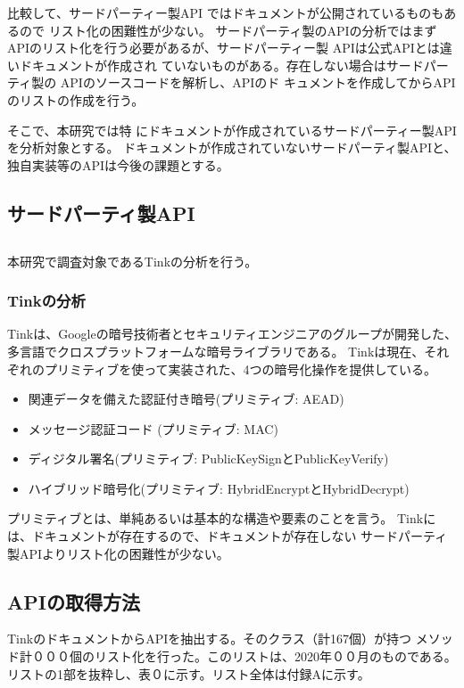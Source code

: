 比較して、サードパーティー製API
ではドキュメントが公開されているものもあるので
リスト化の困難性が少ない。
サードパーティ製のAPIの分析ではまずAPIのリスト化を行う必要があるが、サードパーティー製
APIは公式APIとは違いドキュメントが作成され
ていないものがある。存在しない場合はサードパー
ティ製の APIのソースコードを解析し、APIのド
キュメントを作成してからAPIのリストの作成を行う。


そこで、本研究では特
にドキュメントが作成されているサードパーティー製APIを分析対象とする。
ドキュメントが作成されていないサードパーティ製APIと、独自実装等のAPIは今後の課題とする。

\subsection{サードパーティ製API}



\subsection{}
本研究で調査対象であるTinkの分析を行う。
\subsubsection{Tinkの分析}
Tinkは、Googleの暗号技術者とセキュリティエンジニアのグループが開発した、
多言語でクロスプラットフォームな暗号ライブラリである。
Tinkは現在、それぞれのプリミティブを使って実装された、4つの暗号化操作を提供している。
\begin{itemize}
\item 関連データを備えた認証付き暗号(プリミティブ: AEAD)
\item メッセージ認証コード (プリミティブ: MAC)
\item ディジタル署名(プリミティブ: PublicKeySignとPublicKeyVerify)
\item ハイブリッド暗号化(プリミティブ: HybridEncryptとHybridDecrypt)
\end{itemize}
プリミティブとは、単純あるいは基本的な構造や要素のことを言う。
Tinkには、ドキュメントが存在するので、ドキュメントが存在しない
サードパーティ製APIよりリスト化の困難性が少ない。

\subsection{APIの取得方法}
Tinkのドキュメント\cite{Tink Cryptography}からAPIを抽出する。そのクラス（計167個）が持つ
メソッド計０００個のリスト化を行った。このリストは、2020年００月のものである。
リストの1部を抜粋し、表０に示す。リスト全体は付録Aに示す。


